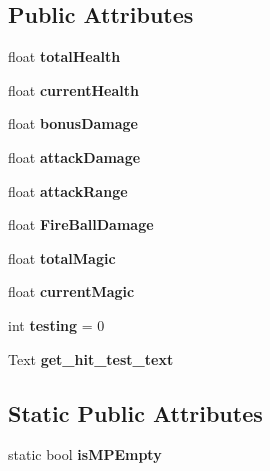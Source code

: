 \subsection*{Public Attributes}
\begin{DoxyCompactItemize}
\item 
\mbox{\label{class_player_controller_a6c75dd8eb546137c938fd7f905f436e1}} 
float {\bfseries total\+Health}
\item 
\mbox{\label{class_player_controller_ae5aeb12c3428a159217f344f65e0157c}} 
float {\bfseries current\+Health}
\item 
\mbox{\label{class_player_controller_a542d23df124e6e5bb18e2c45ab41460f}} 
float {\bfseries bonus\+Damage}
\item 
\mbox{\label{class_player_controller_a5975746e745d9b45311d9390cb90d6de}} 
float {\bfseries attack\+Damage}
\item 
\mbox{\label{class_player_controller_a6aacf1ddffa7f9dcad7cea65d783dad9}} 
float {\bfseries attack\+Range}
\item 
\mbox{\label{class_player_controller_aadd777145dd521976b6b4a3b0cec4962}} 
float {\bfseries Fire\+Ball\+Damage}
\item 
\mbox{\label{class_player_controller_a803deb3e0d96af2703a5c7895d52a7fc}} 
float {\bfseries total\+Magic}
\item 
\mbox{\label{class_player_controller_afbaf25b036328f1979c15faf6f3cb490}} 
float {\bfseries current\+Magic}
\item 
\mbox{\label{class_player_controller_a4889aa500aabf1be255f6ebafe1adb6d}} 
int {\bfseries testing} = 0
\item 
\mbox{\label{class_player_controller_af42ccb7ebb751407646ba3631728b55c}} 
Text {\bfseries get\+\_\+hit\+\_\+test\+\_\+text}
\end{DoxyCompactItemize}
\subsection*{Static Public Attributes}
\begin{DoxyCompactItemize}
\item 
\mbox{\label{class_player_controller_a2aa558e2c2338777ffc95245639adf74}} 
static bool {\bfseries is\+M\+P\+Empty}
\end{DoxyCompactItemize}
